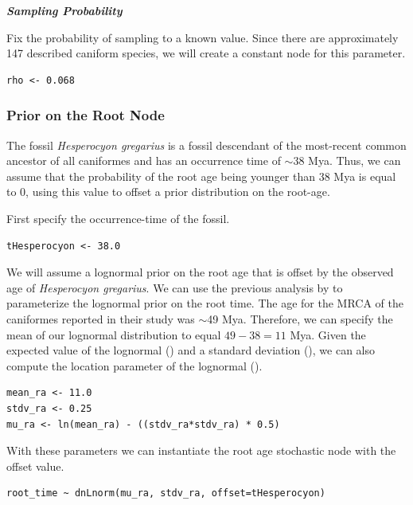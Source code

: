 \textbf{\textit{Sampling Probability}}

Fix the probability of sampling to a known value. Since there are approximately 147 described caniform species, we will create a constant node for this parameter.
{\tt \begin{snugshade*}
\begin{lstlisting}
rho <- 0.068
\end{lstlisting}
\end{snugshade*}}

\subsubsection{Prior on the Root Node}

The fossil \textit{Hesperocyon gregarius} is a fossil descendant of the most-recent common ancestor of all caniformes and has an occurrence time of $\sim$38 Mya.
Thus, we can assume that the probability of the root age being younger than 38 Mya is equal to 0, using this value to offset a prior distribution on the root-age.

First specify the occurrence-time of the fossil.
{\tt \begin{snugshade*}
\begin{lstlisting}
tHesperocyon <- 38.0
\end{lstlisting}
\end{snugshade*}}

We will assume a lognormal prior on the root age that is offset by the observed age of \textit{Hesperocyon gregarius}. 
We can use the previous analysis by \citet{dosReis2012} to parameterize the lognormal prior on the root time. 
The age for the MRCA of the caniformes reported in their study was $\sim$49 Mya. 
Therefore, we can specify the mean of our lognormal distribution to equal $49 - 38 = 11$ Mya.
Given the expected value of the lognormal () and a standard deviation (), we can also compute the location parameter of the lognormal ().
{\tt \begin{snugshade*}
\begin{lstlisting}
mean_ra <- 11.0
stdv_ra <- 0.25
mu_ra <- ln(mean_ra) - ((stdv_ra*stdv_ra) * 0.5)
\end{lstlisting}
\end{snugshade*}}

With these parameters we can instantiate the root age stochastic node with the offset value.
{\tt \begin{snugshade*}
\begin{lstlisting}
root_time ~ dnLnorm(mu_ra, stdv_ra, offset=tHesperocyon)
\end{lstlisting}
\end{snugshade*}}


